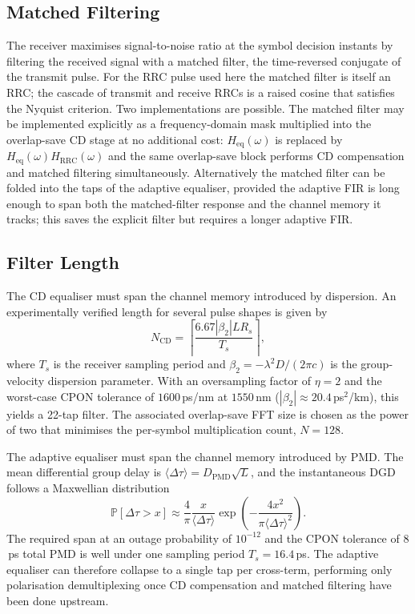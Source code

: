 \documentclass[12pt,a4paper]{report}
\begin{document}
\subsection{Matched Filtering}
The receiver maximises signal-to-noise ratio at the symbol decision instants by filtering the received signal with a matched filter, the time-reversed conjugate of the transmit pulse. For the RRC pulse used here the matched filter is itself an RRC; the cascade of transmit and receive RRCs is a raised cosine that satisfies the Nyquist criterion. Two implementations are possible. The matched filter may be implemented explicitly as a frequency-domain mask multiplied into the overlap-save CD stage at no additional cost: $H_\mathrm{eq}(\omega)$ is replaced by $H_\mathrm{eq}(\omega)H_\mathrm{RRC}(\omega)$ and the same overlap-save block performs CD compensation and matched filtering simultaneously. Alternatively the matched filter can be folded into the taps of the adaptive equaliser, provided the adaptive FIR is long enough to span both the matched-filter response and the channel memory it tracks; this saves the explicit filter but requires a longer adaptive FIR.

\subsection{Filter Length}
The CD equaliser must span the channel memory introduced by dispersion. An experimentally verified length for several pulse shapes is given by \cite{Ezra;07}
\begin{equation}
    N_\mathrm{CD} = \left\lceil\frac{6.67|\beta_2|LR_s}{T_s}\right\rceil,
    \label{eq:cd_len}
\end{equation}
where $T_s$ is the receiver sampling period and $\beta_2 = -\lambda^2 D/(2\pi c)$ is the group-velocity dispersion parameter. With an oversampling factor of $\eta = 2$ and the worst-case CPON tolerance of $1600$\,ps/nm at $1550$\,nm ($|\beta_2|\approx20.4$\,ps$^2$/km), this yields a 22-tap filter. The associated overlap-save FFT size is chosen as the power of two that minimises the per-symbol multiplication count, $N = 128$.

The adaptive equaliser must span the channel memory introduced by PMD. The mean differential group delay is $\langle\Delta\tau\rangle = D_\mathrm{PMD}\sqrt{L}$, and the instantaneous DGD follows a Maxwellian distribution \cite{Mantzoukis:11}
\begin{equation}
    \mathbb{P}[\Delta\tau > x] \approx \frac{4}{\pi}\frac{x}{\langle\Delta\tau\rangle}\exp\!\left(-\frac{4x^2}{\pi\langle\Delta\tau\rangle^2}\right).
    \label{eq:maxwellian}
\end{equation}
The required span at an outage probability of $10^{-12}$ and the CPON tolerance of $8$\,ps total PMD is well under one sampling period $T_s = 16.4$\,ps. The adaptive equaliser can therefore collapse to a single tap per cross-term, performing only polarisation demultiplexing once CD compensation and matched filtering have been done upstream.
\end{document}
